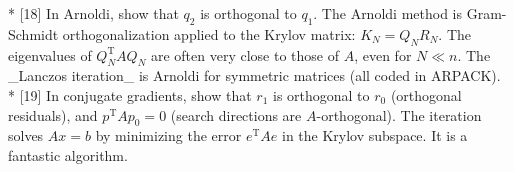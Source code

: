 * [18] In Arnoldi, show that \(q_{2}\) is orthogonal to \(q_{1}\). The Arnoldi method is Gram-Schmidt orthogonalization applied to the Krylov matrix: \(K_{N}=Q_{N}R_{N}\). The eigenvalues of \(Q_{N}^{\mathrm{T}}AQ_{N}\) are often very close to those of \(A\), even for \(N\ll n\). The _Lanczos iteration_ is Arnoldi for symmetric matrices (all coded in ARPACK).
* [19] In conjugate gradients, show that \(r_{1}\) is orthogonal to \(r_{0}\) (orthogonal residuals), and \(p^{\mathrm{T}}Ap_{0}=0\) (search directions are \(A\)-orthogonal). The iteration solves \(Ax=b\) by minimizing the error \(e^{\mathrm{T}}Ae\) in the Krylov subspace. It is a fantastic algorithm.

 
